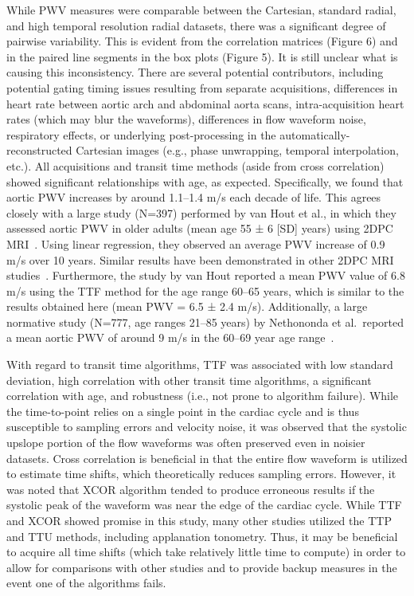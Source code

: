 While PWV measures were comparable between the Cartesian, standard radial, and high temporal resolution radial datasets, there was a significant degree of pairwise variability. This is evident from the correlation matrices (Figure 6) and in the paired line segments in the box plots (Figure 5). It is still unclear what is causing this inconsistency. There are several potential contributors, including potential gating timing issues resulting from separate acquisitions, differences in heart rate between aortic arch and abdominal aorta scans, intra-acquisition heart rates (which may blur the waveforms), differences in flow waveform noise, respiratory effects, or underlying post-processing in the automatically-reconstructed Cartesian images (e.g., phase unwrapping, temporal interpolation, etc.). All acquisitions and transit time methods (aside from cross correlation) showed significant relationships with age, as expected. Specifically, we found that aortic PWV increases by around 1.1--1.4 m/s each decade of life. This agrees closely with a large study (N=397) performed by van Hout et al., in which they assessed aortic PWV in older adults (mean age 55 ± 6 [SD] years) using 2DPC MRI~\cite{vanhoutNormalReferenceValues2021}. Using linear regression, they observed an average PWV increase of 0.9 m/s over 10 years. Similar results have been demonstrated in other 2DPC MRI studies~\cite{dyverfeldtQuantificationIntravoxelVelocity2006,parikhMeasurementPulseWave2016}. Furthermore, the study by van Hout reported a mean PWV value of 6.8 m/s using the TTF method for the age range 60--65 years, which is similar to the results obtained here (mean PWV = 6.5 ± 2.4 m/s). Additionally, a large normative study (N=777, age ranges 21--85 years) by Nethononda et al.\ reported a mean aortic PWV of around 9 m/s in the 60--69 year age range~\cite{nethonondaGenderSpecificPatterns2015}. 

With regard to transit time algorithms, TTF was associated with low standard deviation, high correlation with other transit time algorithms, a significant correlation with age, and robustness (i.e., not prone to algorithm failure). While the time-to-point relies on a single point in the cardiac cycle and is thus susceptible to sampling errors and velocity noise, it was observed that the systolic upslope portion of the flow waveforms was often preserved even in noisier datasets. Cross correlation is beneficial in that the entire flow waveform is utilized to estimate time shifts, which theoretically reduces sampling errors. However, it was noted that XCOR algorithm tended to produce erroneous results if the systolic peak of the waveform was near the edge of the cardiac cycle. While TTF and XCOR showed promise in this study, many other studies utilized the TTP and TTU methods, including applanation tonometry. Thus, it may be beneficial to acquire all time shifts (which take relatively little time to compute) in order to allow for comparisons with other studies and to provide backup measures in the event one of the algorithms fails. 

